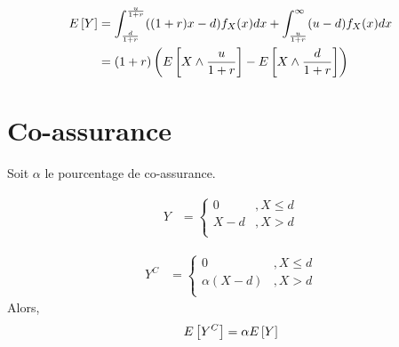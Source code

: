 \documentclass[12pt, french]{report}
\begin{document}
\begin{align*}
E \left[ Y \right]	& = \int_{\frac{d}{1+r}}^{\frac{u}{1+r}} ((1+r) x - d) f_X(x) dx + \int_{\frac{u}{1+r}}^{\infty} (u-d) f_X(x) dx \\
	& = (1+r) \left( E \left[ X \wedge \frac{u}{1+r} \right] - E \left[ X \wedge \frac{d}{1+r} \right]   \right) \\
\end{align*}


\section{Co-assurance}
Soit $\alpha$ le pourcentage de co-assurance.

\begin{align*}
Y	& = 
\begin{cases}
0		& , X \leq d \\
X - d	& , X > d \\
\end{cases}
\end{align*}

\begin{align*}
Y^C	& = 
\begin{cases}
0		& , X  \leq d \\
\alpha(X - d) 	& , X > d \\
\end{cases}
\end{align*}
Alors,
\begin{equation}
E \left[ Y^C \right] = \alpha E \left[ Y \right]
\end{equation}
\end{document}
